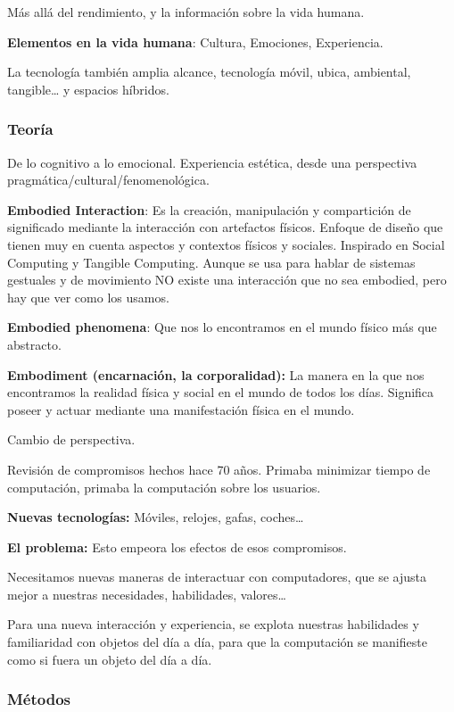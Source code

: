 \documentclass[12pt, twoside, openright]{report} %
\begin{document}
Más allá del rendimiento, y la información sobre la vida humana.

\textbf{Elementos en la vida humana}: Cultura, Emociones, Experiencia.

La tecnología también amplia alcance, tecnología móvil, ubica,
ambiental, tangible\ldots{} y espacios híbridos.

\subsubsection{Teoría}

De lo cognitivo a lo emocional. Experiencia estética, desde una
perspectiva pragmática/cultural/fenomenológica.

\textbf{Embodied Interaction}: Es la creación, manipulación y
compartición de significado mediante la interacción con artefactos
físicos. Enfoque de diseño que tienen muy en cuenta aspectos y contextos
físicos y sociales. Inspirado en Social Computing y Tangible Computing.
Aunque se usa para hablar de sistemas gestuales y de movimiento NO
existe una interacción que no sea embodied, pero hay que ver como los
usamos.

\textbf{Embodied phenomena}: Que nos lo encontramos en el mundo físico
más que abstracto.

\textbf{Embodiment (encarnación, la corporalidad):} La manera en la que
nos encontramos la realidad física y social en el mundo de todos los
días. Significa poseer y actuar mediante una manifestación física en el
mundo.

Cambio de perspectiva.

Revisión de compromisos hechos hace 70 años. Primaba minimizar tiempo de
computación, primaba la computación sobre los usuarios.

\textbf{Nuevas tecnologías:} Móviles, relojes, gafas, coches\ldots{}

\textbf{El problema:} Esto empeora los efectos de esos compromisos.

Necesitamos nuevas maneras de interactuar con computadores, que se
ajusta mejor a nuestras necesidades, habilidades, valores\ldots{}

Para una nueva interacción y experiencia, se explota nuestras habilidades
y familiaridad con objetos del día a día, para que la computación se
manifieste como si fuera un objeto del día a día.

\subsubsection{Métodos}
\end{document}
